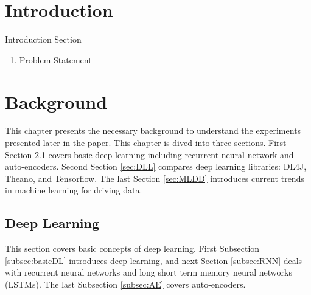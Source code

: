 \documentclass[draft,dvipsnames]{drexel-thesis}
\begin{document}
\begin{thesis}



\chapter{Introduction}\label{chap:intro}

Introduction Section
\begin{enumerate}
\item Problem Statement
\end{enumerate}



\chapter{Background}\label{sec:bg}
This chapter presents the necessary background to understand the experiments presented later in the paper. This chapter is dived into three sections. First Section \ref{sec:DL} covers basic deep learning including recurrent neural network and auto-encoders. Second Section \ref{sec:DLL} compares deep learning libraries: DL4J, Theano, and Tensorflow. The last Section \ref{sec:MLDD} introduces current trends in machine learning for driving data.

\section{Deep Learning}\label{sec:DL}
This section covers basic concepts of deep learning. First Subsection \ref{subsec:basicDL} introduces deep learning, and next Section \ref{subsec:RNN} deals with recurrent neural networks and long short term memory neural networks (LSTMs). The last Subsection \ref{subsec:AE} covers auto-encoders.


\end{thesis}
\end{document}
